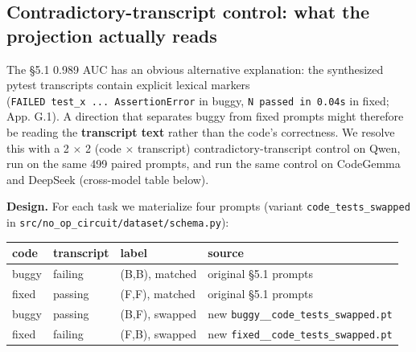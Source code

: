 \documentclass[
  11pt,
  a4paper]{article}
\newcounter{none} %
\begin{document}
\subsection{Contradictory-transcript control: what the projection
actually
reads}\label{contradictory-transcript-control-what-the-projection-actually-reads}

The \S{}5.1 0.989 AUC has an obvious alternative explanation: the
synthesized pytest transcripts contain explicit lexical markers
(\texttt{FAILED\ test\_x\ ...\ AssertionError} in buggy,
\texttt{N\ passed\ in\ 0.04s} in fixed; App. G.1). A direction that
separates buggy from fixed prompts might therefore be reading the
\textbf{transcript text} rather than the code's correctness. We resolve
this with a 2 \ensuremath{\times} 2 (code \ensuremath{\times} transcript) contradictory-transcript control
on Qwen, run on the same 499 paired prompts, and run the same control on
CodeGemma and DeepSeek (cross-model table below).

\textbf{Design.} For each task we materialize four prompts (variant
\texttt{code\_tests\_swapped} in
\texttt{src/no\_op\_circuit/dataset/schema.py}):

{\def\LTcaptype{none} %
\begin{longtable}[]{@{}
  >{\raggedright\arraybackslash}p{}
  >{\raggedright\arraybackslash}p{}
  >{\raggedright\arraybackslash}p{}
  >{\raggedright\arraybackslash}p{}@{}}
\toprule\noalign{}
\begin{minipage}[b]{\linewidth}\raggedright
code
\end{minipage} & \begin{minipage}[b]{\linewidth}\raggedright
transcript
\end{minipage} & \begin{minipage}[b]{\linewidth}\raggedright
label
\end{minipage} & \begin{minipage}[b]{\linewidth}\raggedright
source
\end{minipage} \\
\midrule\noalign{}
\endhead
\bottomrule\noalign{}
\endlastfoot
buggy & failing & (B,B), matched & original \S{}5.1 prompts \\
fixed & passing & (F,F), matched & original \S{}5.1 prompts \\
buggy & passing & (B,F), swapped & new
\texttt{buggy\_\_code\_tests\_swapped.pt} \\
fixed & failing & (F,B), swapped & new
\texttt{fixed\_\_code\_tests\_swapped.pt} \\
\end{longtable}
}
\end{document}
